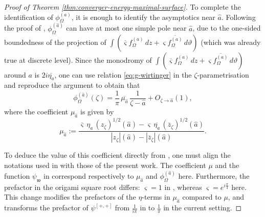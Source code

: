 \documentclass[reqno]{amsart}
\numberwithin{equation}{section}
\theoremstyle{definition}
\theoremstyle{remark}
\begin{document}
\begin{proof}[Proof of Theorem \ref{thm:converger-energy-maximal-surface}]
\medskip

To complete the identification of $\phi^{(a)}_\Omega$, it is enough to identify the asymptotics near $\hat{a}$. Following the proof of \cite[Proposition~3.6]{CLR2}, $\phi^{(\hat{a})}_\Omega$ can have at most one simple pole near $\hat{a}$, due to the one-sided boundedness of the projection of $\int (\overline{\varsigma}f^{(a)}_\Omega\,dz + \varsigma \overline{f^{(a)}_\Omega}\,d\vartheta)$ (which was already true at discrete level). Since the monodromy of $\int (\overline{\varsigma}f^{(a)}_\Omega\,dz + \varsigma \overline{f^{(a)}_\Omega}\,d\vartheta)$ around $a$ is $2i\overline{\eta_a}$, one can use relation \eqref{eq:g-wirtinger} in the $\zeta$-parametrisation and reproduce the argument \cite[proof of Proposition~3.6]{CLR2} to obtain that 
\begin{equation}\label{eq:asymptotic-phi-C}
	\phi^{(\hat{a})}_{\Omega}(\zeta) = \frac{1}{\pi}\,\overline{\mu_{\hat{a}}}\,\frac{1}{\zeta - \hat{a}} + O_{\zeta \to \hat{a}}(1),
\end{equation}
where the coefficient $\mu_{\hat{a}}$ is given by
\begin{equation}\label{eq:residue-full-plane-fermion}
	\mu_{\hat{a}} := \frac{\overline{\varsigma}\,\eta_a\,(z_{\zeta})^{1/2}(\hat{a}) - \varsigma\,\overline{\eta_a}\,(\overline{z}_{\zeta})^{1/2}(\hat{a})}{|z_\zeta|(\hat{a}) - |\overline{z}_\zeta|(\hat{a})}.
\end{equation}


To deduce the value of this coefficient directly from \cite[Proposition~3.6]{CLR2}, one must align the notations used in \cite[Proposition~3.6]{CLR2} with those of the present work. The coefficient $\mu$ and the function $\psi_{\mathfrak{w}}$ in \cite[Proposition~3.6]{CLR2} correspond respectively to $\mu_{\hat{a}}$ and $\phi^{(\hat{a})}_{\Omega}$ here. Furthermore, the prefactor in the origami square root differs: $\varsigma = 1$ in \cite{CLR2}, whereas $\varsigma = e^{i\frac{\pi}{4}}$ here. This change modifies the prefactors of the $\eta$-terms in $\mu_{\hat{a}}$ compared to $\mu$, and transforms the prefactor of $\psi^{[+,+]}$ from $\frac{1}{i\pi}$ in \cite{CLR2} to $\frac{1}{\pi}$ in the current setting.


\end{proof}
\end{document}
